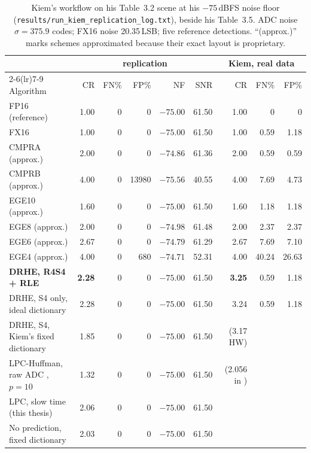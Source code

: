 \begin{table}[htbp]
\centering
\caption[Replication at $-75$\,dBFS]{Kiem's workflow on his Table~3.2 scene at
his $-75$\,dBFS noise floor (\texttt{results/run\_kiem\_replication\_log.txt}),
beside his Table~3.5. ADC noise $\sigma = 375.9$ codes; FX16 noise
\num{20.35}\,LSB; five reference detections. ``(approx.)'' marks schemes
approximated because their exact layout is proprietary.}
\label{tab:kr_m75}
\small
\setlength{\tabcolsep}{4pt}
\begin{tabular}{@{}lrrrrr@{\hskip 12pt}rrr@{}}
\toprule
& \multicolumn{5}{c}{\textbf{replication}} & \multicolumn{3}{c}{\textbf{Kiem, real data}}\\
\cmidrule(lr){2-6}\cmidrule(lr){7-9}
Algorithm & CR & FN\% & FP\% & NF & SNR & CR & FN\% & FP\%\\
\midrule
FP16 (reference)                   & 1.00 & 0 & 0 & $-75.00$ & 61.50 & 1.00 & 0 & 0\\
FX16                               & 1.00 & 0 & 0 & $-75.00$ & 61.50 & 1.00 & 0.59 & 1.18\\
CMPRA (approx.)                    & 2.00 & 0 & 0 & $-74.86$ & 61.36 & 2.00 & 0.59 & 0.59\\
CMPRB (approx.)                    & 4.00 & 0 & 13980 & $-75.56$ & 40.55 & 4.00 & 7.69 & 4.73\\
EGE10 (approx.)                    & 1.60 & 0 & 0 & $-75.00$ & 61.50 & 1.60 & 1.18 & 1.18\\
EGE8 (approx.)                     & 2.00 & 0 & 0 & $-74.98$ & 61.48 & 2.00 & 2.37 & 2.37\\
EGE6 (approx.)                     & 2.67 & 0 & 0 & $-74.79$ & 61.29 & 2.67 & 7.69 & 7.10\\
EGE4 (approx.)                     & 4.00 & 0 & 680 & $-74.71$ & 52.31 & 4.00 & 40.24 & 26.63\\
\textbf{DRHE, R4S4 + RLE}          & \textbf{2.28} & 0 & 0 & $-75.00$ & 61.50 & \textbf{3.25} & 0.59 & 1.18\\
DRHE, S4 only, ideal dictionary    & 2.28 & 0 & 0 & $-75.00$ & 61.50 & 3.24 & 0.59 & 1.18\\
DRHE, S4, Kiem's fixed dictionary  & 1.85 & 0 & 0 & $-75.00$ & 61.50 & (3.17 HW) & & \\
LPC-Huffman, raw ADC \cite{meucci2022}, $p=10$  & 1.32 & 0 & 0 & $-75.00$ & 61.50 & (2.056 in \cite{meucci2022}) & & \\
LPC, slow time (this thesis)       & 2.06 & 0 & 0 & $-75.00$ & 61.50 & & & \\
No prediction, fixed dictionary    & 2.03 & 0 & 0 & $-75.00$ & 61.50 & & & \\
\bottomrule
\end{tabular}
\end{table}

